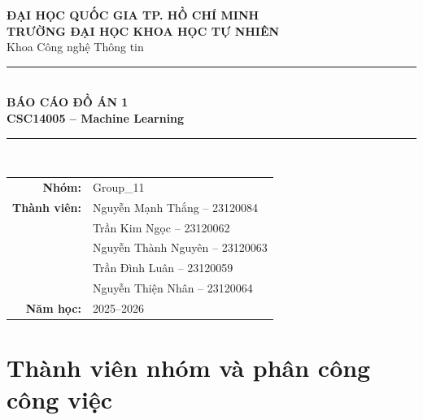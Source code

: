 \documentclass[12pt,a4paper]{article}
\let\oldpart\part
\renewcommand{\part}{%
  \setcounter{section}{0}%
  \setcounter{subsection}{0}%
  \oldpart
}
\begin{document}
\begin{titlepage}
\thispagestyle{empty}
\centering
\vspace*{1.15cm}
{\Large \textbf{ĐẠI HỌC QUỐC GIA TP. HỒ CHÍ MINH}}\\[0.15cm]
{\Large \textbf{TRƯỜNG ĐẠI HỌC KHOA HỌC TỰ NHIÊN}}\\[0.25cm]
{\large Khoa Công nghệ Thông tin}\\[2.0cm]

{\color{HCMUSBlue}\rule{0.68\linewidth}{0.7pt}}\\[0.75cm]
{\fontsize{24}{30}\selectfont\bfseries\color{HCMUSBlue} BÁO CÁO ĐỒ ÁN 1}\\[0.45cm]
{\Large\bfseries CSC14005 -- Machine Learning}\\[0.35cm]
{\color{HCMUSBlue}\rule{0.68\linewidth}{0.7pt}}\\[1.4cm]

\begin{tabular}{rl}
\textbf{Nhóm:} & Group\_11 \\[4pt]
\textbf{Thành viên:} & Nguyễn Mạnh Thắng -- 23120084 \\
& Trần Kim Ngọc -- 23120062 \\
& Nguyễn Thành Nguyên -- 23120063 \\
& Trần Đình Luân -- 23120059 \\
& Nguyễn Thiện Nhân -- 23120064 \\[4pt]
\textbf{Năm học:} & 2025--2026
\end{tabular}

\vfill
\end{titlepage}

\tableofcontents
\newpage

\part{Thành viên nhóm và phân công công việc}
\end{document}

